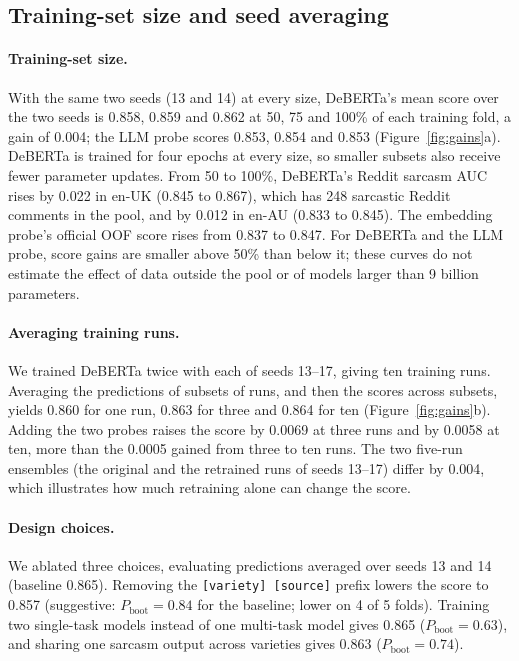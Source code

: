 \documentclass[11pt]{article}
\newcommand{\pboot}{P_{\mathrm{boot}}}
\begin{document}
\subsection{Training-set size and seed averaging}
\label{sec:capacity}
\paragraph{Training-set size.} With the same two seeds (13 and 14) at every size, DeBERTa's
mean score over the two seeds is 0.858, 0.859 and 0.862
at 50, 75 and 100\% of each training fold, a gain of 0.004; the LLM probe scores 0.853, 0.854 and 0.853
(Figure~\ref{fig:gains}a). DeBERTa is trained for four epochs at every size, so smaller subsets also receive fewer
parameter updates. From 50 to 100\%, DeBERTa's Reddit sarcasm AUC rises by 0.022 in en-UK (0.845 to 0.867), which has
248 sarcastic Reddit comments in the pool, and by 0.012 in en-AU (0.833 to 0.845). The embedding probe's official OOF score rises from 0.837
to 0.847. For DeBERTa and the LLM probe, score gains are smaller above 50\% than below it; these curves do not estimate
the effect of data outside the pool or of models larger than 9 billion parameters.

\paragraph{Averaging training runs.} We trained DeBERTa twice with each of seeds 13--17, giving ten training runs.
Averaging the predictions of subsets of runs, and then the scores across subsets, yields 0.860 for one run,
0.863 for three and 0.864 for ten (Figure~\ref{fig:gains}b). Adding the two probes raises the score by 0.0069 at three runs and by 0.0058 at
ten, more than the 0.0005 gained from three to ten runs. The two five-run ensembles (the original and the retrained runs of
seeds 13--17) differ by 0.004, which illustrates how much retraining alone can change the score.

\paragraph{Design choices.} We ablated three choices, evaluating predictions averaged over seeds 13 and 14 (baseline
0.865). Removing the \texttt{[variety] [source]} prefix lowers the score to 0.857 (suggestive: $\pboot=0.84$ for the
baseline; lower on 4 of 5 folds). Training two single-task models instead of one multi-task model gives 0.865
($\pboot=0.63$), and sharing one sarcasm output across varieties gives 0.863 ($\pboot=0.74$).
\end{document}
